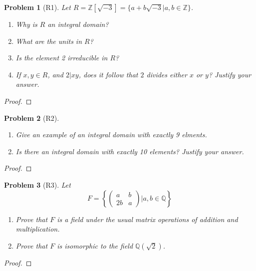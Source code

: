 \documentclass[10pt]{article}
\newcommand{\sk}{\vskip 10mm}
\newcommand{\bb}[1]{\mathbb{#1}}
\theoremstyle{plain}
\newtheorem{problem}{Problem}
\theoremstyle{remark}
\begin{document}
\begin{problem}[R1]
  Let $R=\bb{Z}[\sqrt{-3}]=\{a+b\sqrt{-3}|a,b\in\bb{Z}\}$.
  \begin{enumerate}
  \item Why is $R$ an integral domain?
  \item What are the units in $R$?
  \item Is the element 2 irreducible in $R$?
  \item If $x,y\in R$, and $2|xy$, does it follow that $2$ divides
    either $x$ or $y$? Justify your answer.
  \end{enumerate}
\end{problem}

\begin{proof}
  
\end{proof}

\sk

\begin{problem}[R2]
  \begin{enumerate}
  \item Give an example of an integral domain with exactly 9 elments.
  \item Is there an integral domain with exactly 10 elements? Justify
    your answer.
  \end{enumerate}
\end{problem}

\begin{proof}
  
\end{proof}

\sk

\begin{problem}[R3]
  Let
  \[
    F =
    \left\{\left(
        \begin{array}{cc}
          a&b\\
          2b&a
        \end{array}
      \right)| a,b\in \bb{Q}\right\}
  \]
  \begin{enumerate}
  \item Prove that $F$ is a field under the usual matrix operations of addition
    and multiplication.
  \item Prove that $F$ is isomorphic to the field $\bb{Q}(\sqrt{2})$.
  \end{enumerate}
\end{problem}

\begin{proof}
  
\end{proof}

\sk

\end{document}
